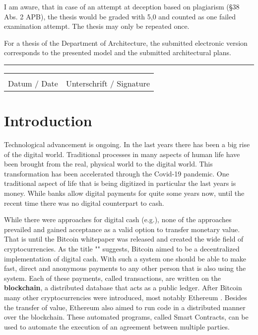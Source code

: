 \documentclass{cacthesis}
\begin{document}
	I am aware, that in case of an attempt at deception based on plagiarism (§38 Abs. 2 APB), the thesis would be graded with 5,0 and counted as one failed examination attempt. The thesis may only be repeated once.
	
	For a thesis of the Department of Architecture, the submitted electronic version corresponds to the presented model and the submitted architectural plans.
	
	\vspace{10pt}
	\hrule
	\vspace{70pt}
	
	\noindent\begin{tabular}{l@{\hskip 1in}l}
		\makebox[1.8in]{\hrulefill} & \makebox[3.5in]{\hrulefill}\\
		Datum / Date & Unterschrift / Signature
	\end{tabular}
	
	\listoffigures
	\listoftables
	\tableofcontents
	
	\mainmatter
	
	\chapter{Introduction}
	Technological advancement is ongoing. In the last years there has been a big rise of the digital world.  Traditional processes in many aspects of human life have been brought from the real, physical world to the digital world. This transformation has been accelerated through the Covid-19 pandemic. One traditional aspect of life that is being digitized in particular the last years is money. While banks allow digital payments for quite some years now, until the recent time there was no digital counterpart to cash. \newline%
	
	While there were approaches for digital cash (e.g.\cite{chaum_83}), none of the approaches prevailed and gained acceptance as a valid option to transfer monetary value. That is until the Bitcoin whitepaper \cite{nakamoto_bitcoin_nodate} was released and created the wide field of cryptocurrencies. As the title "" suggests, Bitcoin aimed to be a decentralized implementation of digital cash. With such a system one should be able to make fast, direct and anonymous payments to any other person that is also using the system. Each of these payments, called transactions, are written on the \textbf{blockchain}, a distributed database that acts as a public ledger. After Bitcoin many other cryptocurrencies were introduced, most notably Ethereum \cite{buterin_ethereum_nodate}. Besides the transfer of value, Ethereum also aimed to run code in a distributed manner over the blockchain. These automated programs, called Smart Contracts, can be used to automate the execution of an agreement between multiple parties.\newline
	
\end{document}
